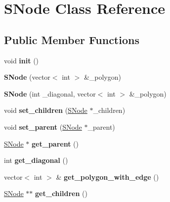 \hypertarget{class_s_node}{}\section{S\+Node Class Reference}
\label{class_s_node}
\subsection*{Public Member Functions}
\begin{DoxyCompactItemize}
\item 
\mbox{\label{class_s_node_a30f40a550db7b67f687a1cdc188e4b85}} 
void {\bfseries init} ()
\item 
\mbox{\label{class_s_node_a5289ecfb10c28f55a7eca29b79906dc7}} 
{\bfseries S\+Node} (vector$<$ int $>$ \&\+\_\+polygon)
\item 
\mbox{\label{class_s_node_ac88e1a7de21f0c6f047e547cae47b9ac}} 
{\bfseries S\+Node} (int \+\_\+diagonal, vector$<$ int $>$ \&\+\_\+polygon)
\item 
\mbox{\label{class_s_node_a0c9e50d454c7eb0cfe1bc6afa2d7a61d}} 
void {\bfseries set\+\_\+children} (\mbox{\hyperlink{class_s_node}{S\+Node}} $\ast$\+\_\+children)
\item 
\mbox{\label{class_s_node_ac7ddda6607b1973358f0d13a76494cfd}} 
void {\bfseries set\+\_\+parent} (\mbox{\hyperlink{class_s_node}{S\+Node}} $\ast$\+\_\+parent)
\item 
\mbox{\label{class_s_node_aa9a7033cd017e445305c5adfa2fa9400}} 
\mbox{\hyperlink{class_s_node}{S\+Node}} $\ast$ {\bfseries get\+\_\+parent} ()
\item 
\mbox{\label{class_s_node_a0106c79b8c4e6feb0c2bcaae778b637e}} 
int {\bfseries get\+\_\+diagonal} ()
\item 
\mbox{\label{class_s_node_a34d72bff699039081b80d4095bb4dffd}} 
vector$<$ int $>$ \& {\bfseries get\+\_\+polygon\+\_\+with\+\_\+edge} ()
\item 
\mbox{\label{class_s_node_ac4c14e2652a732426581fd098d437a66}} 
\mbox{\hyperlink{class_s_node}{S\+Node}} $\ast$$\ast$ {\bfseries get\+\_\+children} ()
$$
\end{DoxyCompactItemize}
